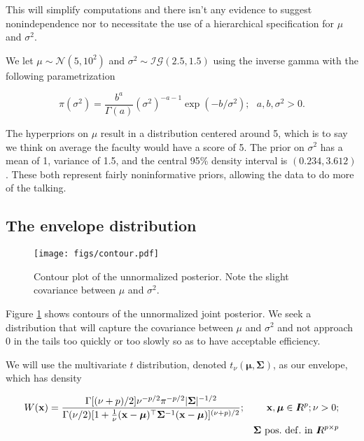\documentclass[12pt]{article}
\newcommand{\m}[1]{\mathbf{\bm{#1}}}
\newcommand{\R}{I\hspace{-4.4pt}R}
\begin{document}
\noindent This will simplify computations and there isn't any evidence to suggest nonindependence nor to necessitate the use of a hierarchical specification for $\mu$ and $\sigma^2$.
\bigskip

\noindent We let $\mu\sim\mathcal{N}(5, 10^2)$ and $\sigma^2\sim\mathcal{IG}(2.5, 1.5)$ using the inverse gamma with the following parametrization

\[ \pi(\sigma^2) = \frac{b^a}{\Gamma(a)}(\sigma^2)^{-a-1}\exp(-b/\sigma^2);~~~ a,b,\sigma^2>0. \]

\noindent The hyperpriors on $\mu$ result in a distribution centered around 5, which is to say we think on average the faculty would have a score of 5. The prior on $\sigma^2$ has a mean of 1, variance of 1.5, and the central 95\% density interval is $(0.234, 3.612)$. These both represent fairly noninformative priors, allowing the data to do more of the talking.

\subsection{The envelope distribution}

\begin{figure}
    \begin{center}
    \texttt{[image: figs/contour.pdf]}
    \end{center}
    \caption{Contour plot of the unnormalized posterior. Note the slight covariance between $\mu$ and $\sigma^2$.}
    \label{contour}
\end{figure}


\noindent Figure \ref{contour} shows contours of the unnormalized joint posterior. We seek a distribution that will capture the covariance between $\mu$ and $\sigma^2$ and not approach $0$ in the tails too quickly or too slowly so as to have acceptable efficiency.
\bigskip

\noindent We will use the multivariate $t$ distribution, denoted $t_\nu(\m{\mu}, \m{\Sigma})$, as our envelope, which has density

\begin{eqnarray*}
W(\m{x}) = \frac{\Gamma[(\nu+p)/2]\nu^{-p/2}\pi^{-p/2}|\m{\Sigma}|^{-1/2}}{\Gamma(\nu/2)[1+\frac{1}{\nu}(\m{x}-\m{\mu})^\top\m{\Sigma}^{-1}(\m{x}-\m{\mu})]^{(\nu+p)/2}}; && \m{x}, \m{\mu} \in \R^p; \nu>0; \\
&& \m{\Sigma}~\mathrm{pos.~def.~in~} \R^{p\times p}
\end{eqnarray*}
\end{document}

